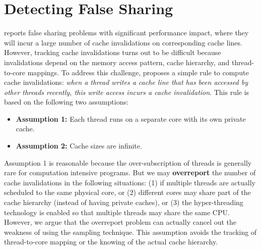 \section{Detecting False Sharing}
\label{sec:detect}

\cheetah{} reports false sharing problems with significant performance impact, where they will incur a large number of cache invalidations on corresponding cache lines. However, tracking cache invalidations turns out to be difficult because invalidations depend on the memory access pattern, cache hierarchy, and thread-to-core mappings. 
To address this challenge, \cheetah{} proposes a simple rule to compute cache invalidations: \emph{when a thread writes a cache line that has been accessed by other threads recently, this write access incurs a cache invalidation}. This rule is based on the following two assumptions:
 

\begin{itemize} 
\item {\bf Assumption 1:} Each thread runs on a separate core with its own private cache. 

\item {\bf Assumption 2: } Cache sizes are infinite. 
 
\end{itemize}

Assumption 1 is reasonable because the over-subscription of threads is generally rare for computation intensive programs. But we may {\bf overreport} the number of cache invalidations in the following situations: (1) if multiple threads are actually scheduled to the same physical core, or (2) different cores may share part of the cache hierarchy (instead of having private caches), or (3) the hyper-threading technology is enabled so that multiple threads may share the same CPU. However, we argue that the overreport problem can actually cancel out the weakness of using the sampling technique. 
This assumption avoids the tracking of thread-to-core mapping or the knowing of the actual cache hierarchy.

